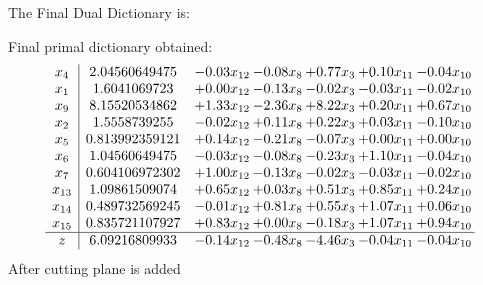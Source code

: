 \documentclass[8pt]{article}
\begin{document}
The Final Dual Dictionary is: 

 Final primal dictionary obtained: 
\[\begin{array}{c| c c@{\hskip 2pt} c@{\hskip 2pt} c@{\hskip 2pt} c@{\hskip 2pt} c@{\hskip 2pt} }
 x_{4}   &  2.04560649475 & -0.03 x_{12} & -0.08 x_{8} & +  0.77 x_{3} & +  0.10 x_{11} & -0.04 x_{10}\\
 x_{1}   &  1.6041069723 & +  0.00 x_{12} & -0.13 x_{8} & -0.02 x_{3} & -0.03 x_{11} & -0.02 x_{10}\\
 x_{9}   &  8.15520534862 & +  1.33 x_{12} & -2.36 x_{8} & +  8.22 x_{3} & +  0.20 x_{11} & +  0.67 x_{10}\\
 x_{2}   &  1.5558739255 & -0.02 x_{12} & +  0.11 x_{8} & +  0.22 x_{3} & +  0.03 x_{11} & -0.10 x_{10}\\
 x_{5}   &  0.813992359121 & +  0.14 x_{12} & -0.21 x_{8} & -0.07 x_{3} & +  0.00 x_{11} & +  0.00 x_{10}\\
 x_{6}   &  1.04560649475 & -0.03 x_{12} & -0.08 x_{8} & -0.23 x_{3} & +  1.10 x_{11} & -0.04 x_{10}\\
 x_{7}   &  0.604106972302 & +  1.00 x_{12} & -0.13 x_{8} & -0.02 x_{3} & -0.03 x_{11} & -0.02 x_{10}\\
 x_{13}   &  1.09861509074 & +  0.65 x_{12} & +  0.03 x_{8} & +  0.51 x_{3} & +  0.85 x_{11} & +  0.24 x_{10}\\
 x_{14}   &  0.489732569245 & -0.01 x_{12} & +  0.81 x_{8} & +  0.55 x_{3} & +  1.07 x_{11} & +  0.06 x_{10}\\
 x_{15}   &  0.835721107927 & +  0.83 x_{12} & +  0.00 x_{8} & -0.18 x_{3} & +  1.07 x_{11} & +  0.94 x_{10}\\
\hline
z    &  6.09216809933 & -0.14 x_{12} & -0.48 x_{8} & -4.46 x_{3} & -0.04 x_{11} & -0.04 x_{10}\\
\end{array}\]
 After cutting plane is added 
\end{document}
